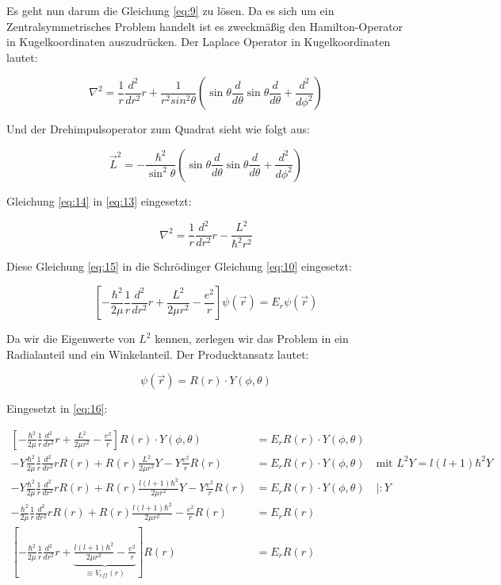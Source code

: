 Es geht nun darum die Gleichung \eqref{eq:9} zu lösen. Da es sich um ein Zentralsymmetrisches Problem handelt ist es zweckmäßig den Hamilton-Operator in Kugelkoordinaten auszudrücken. Der Laplace Operator in Kugelkoordinaten lautet:

\begin{equation}
  \label{eq:13}
  \nabla^2 = \frac{1}{r}\frac{d^2}{dr^2}r + \frac{1}{r^2sin^2\theta}\left( \sin\theta \frac{d}{d\theta}\sin\theta\frac{d}{d\theta}+\frac{d^2}{d\phi^2}\right) 
\end{equation}

Und der Drehimpulsoperator zum Quadrat sieht wie folgt aus:

\begin{equation}
  \label{eq:14}
  \vec L^2 = -\frac{\hbar^2}{\sin^2\theta}\left( \sin\theta \frac{d}{d\theta}\sin\theta\frac{d}{d\theta}+\frac{d^2}{d\phi^2}\right) 
\end{equation}

Gleichung \eqref{eq:14} in  \eqref{eq:13} eingesetzt:

\begin{equation}
  \label{eq:15}
   \nabla^2 = \frac{1}{r}\frac{d^2}{dr^2}r - \frac{L^2}{\hbar^2r^2}
\end{equation}

Diese Gleichung \eqref{eq:15} in die Schrödinger Gleichung \eqref{eq:10} eingesetzt: 

\begin{equation}
  \label{eq:16}
  \left[-\frac{\hbar^2}{2\mu}\frac{1}{r}\frac{d^2}{dr^2}r + \frac{L^2}{2\mu r^2}  - \frac{e^2}{r} \right]\psi(\vec r) = E_r\psi(\vec r) 
\end{equation}

Da wir die Eigenwerte von \(L^2\) kennen, zerlegen wir das Problem in ein Radialanteil und ein Winkelanteil. Der Producktansatz lautet:

\begin{equation}
  \label{eq:17}
  \psi(\vec r) = R(r)\cdot Y(\phi,\theta) 
\end{equation}

Eingesetzt in \eqref{eq:16}:

\begin{align}
  \left[-\frac{\hbar^2}{2\mu}\frac{1}{r}\frac{d^2}{dr^2}r + \frac{L^2}{2\mu r^2}  - \frac{e^2}{r} \right]R(r)\cdot Y(\phi,\theta)  &= E_rR(r)\cdot Y(\phi,\theta) \\
  - Y\frac{\hbar^2}{2\mu}\frac{1}{r}\frac{d^2}{dr^2}r R(r) + R(r)\frac{L^2}{2\mu r^2} Y  -Y \frac{e^2}{r} R(r)   &= E_rR(r)\cdot Y(\phi,\theta) \quad \text{mit } L^2Y = l(l+1)\hbar^2 Y\\
  - Y\frac{\hbar^2}{2\mu}\frac{1}{r}\frac{d^2}{dr^2}r R(r) + R(r)\frac{l(l+1)\hbar^2}{2\mu r^2}Y  -Y \frac{e^2}{r} R(r)   &= E_rR(r)\cdot Y(\phi,\theta) \quad |:Y\\
  - \frac{\hbar^2}{2\mu}\frac{1}{r}\frac{d^2}{dr^2}r R(r) + R(r)\frac{l(l+1)\hbar^2}{2\mu r^2}  - \frac{e^2}{r} R(r)   &= E_rR(r)\\
  \left[- \frac{\hbar^2}{2\mu}\frac{1}{r}\frac{d^2}{dr^2}r + \underbrace{\frac{l(l+1)\hbar^2}{2\mu r^2}  - \frac{e^2}{r}}_{\equiv V_{eff}(r)} \right] R(r)   &= E_rR(r)  \label{eq:18}
\end{align}

